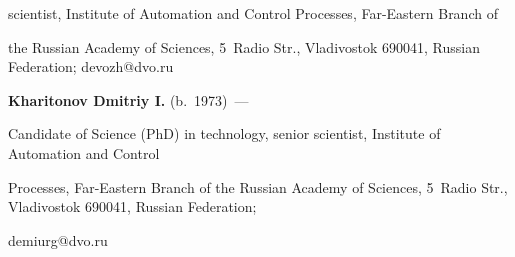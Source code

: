 scientist, Institute of Automation and Control Processes, Far-Eastern Branch of 


the Russian Academy of Sciences, 5~Radio Str., Vladivostok 690041, Russian Federation; \mbox{devozh@dvo.ru}





\vspace*{3pt}





\noindent


\textbf{Kharitonov Dmitriy I.} (b.\ 1973)~--- 


Candidate of Science (PhD) in technology, senior scientist, Institute of Automation and Control 


Processes, Far-Eastern Branch of the Russian Academy of Sciences, 5~Radio Str., Vladivostok 690041, Russian Federation; 


\mbox{demiurg@dvo.ru}











 


\label{end\stat}





\renewcommand{\bibname}{\protect\rm Литература} 


